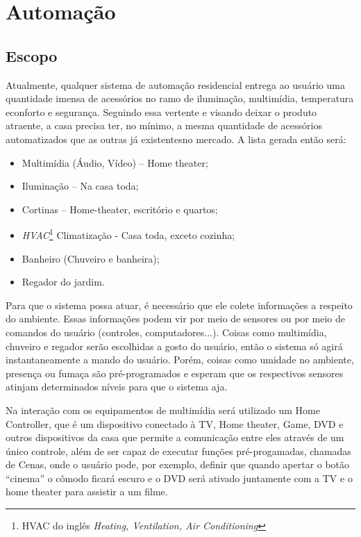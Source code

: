 \chapter{Automação}
\section{Escopo}

	Atualmente, qualquer sistema de automação residencial entrega ao usuário uma quantidade imensa de acessórios no ramo de iluminação, multimídia, temperatura econforto e segurança\cite{2009Montgomery}. Seguindo essa vertente e visando deixar o produto atraente, a casa precisa ter, no mínimo, a mesma quantidade de acessórios automatizados que as outras já existentesno mercado. A lista gerada então será:

\begin{itemize}
	\item Multimídia (Áudio, Vídeo) – Home theater;
	\item Iluminação – Na casa toda;
	\item Cortinas – Home-theater, escritório e quartos;
	\item \textit{HVAC}\footnote{HVAC do inglês \textit{Heating, Ventilation, Air Conditioning}} Climatização - Casa toda, exceto cozinha;
	\item Banheiro (Chuveiro e banheira);
	\item Regador do jardim.
\end{itemize}

	Para que o sistema possa atuar, é necessário que ele colete informações a respeito do ambiente. Essas informações podem vir por meio de sensores ou por meio de comandos do usuário (controles, computadores...). Coisas como multimídia, chuveiro e regador serão escolhidas a gosto do usuário, então o sistema só agirá instantaneamente a mando do usuário. Porém, coisas como umidade no ambiente, presença ou fumaça são pré-programados e esperam que os respectivos sensores atinjam determinados níveis para que o sistema aja.

	Na interação com os equipamentos de multimídia será utilizado um Home Controller, que é um dispositivo conectado à TV, Home theater, Game, DVD e outros dispositivos da casa que permite a comunicação entre eles através de um único controle, além de ser capaz de executar funções pré-progamadas, chamadas de Cenas, onde o usuário pode, por exemplo, definir que quando apertar o botão “cinema” o cômodo ficará escuro e o DVD será ativado juntamente com a TV e o home theater para assistir a um filme.

